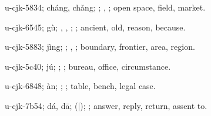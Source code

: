 \begin{multicols}{2}
{\cjkgGlue{}u-cjk-5834; cháng, chǎng; \cjkgGlue{}; \cjkgGlue{}, \cjkgGlue{}; open space, field, market.

\cjkgGlue{}u-cjk-6545; gù; \cjkgGlue{}, \cjkgGlue{}\cjkgGlue{}\cjkgGlue{}, \cjkgGlue{}; \cjkgGlue{}; ancient, old, reason, because.

\cjkgGlue{}u-cjk-5883; jìng; \cjkgGlue{}; \cjkgGlue{}, \cjkgGlue{}; boundary, frontier, area, region.

\cjkgGlue{}u-cjk-5c40; jú; \cjkgGlue{}; \cjkgGlue{}; bureau, office, circumstance.

\cjkgGlue{}u-cjk-6848; àn; \cjkgGlue{}; \cjkgGlue{}; table, bench, legal case.

\cjkgGlue{}u-cjk-7b54; dá, dā; \cjkgGlue{}\cjkgGlue{}(\cjkgGlue{}|\cjkgGlue{}); \cjkgGlue{}; answer, reply, return, assent to.

}
\end{multicols}
